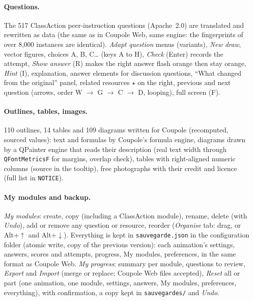 \paragraph{Questions.} The 517 ClassAction peer-instruction questions (Apache~2.0) are translated and rewritten as
data (the same as in Coupole Web, same engine: the fingerprints of over 8,000 instances are identical). \emph{Adapt
question} menus (variants), \emph{New draw}, vector figures, choices A, B, C\dots{} (keys A to H), \emph{Check} (Enter)
records the attempt, \emph{Show answer} (R) makes the right answer flash orange then stay orange, \emph{Hint} (I),
explanation, answer elements for discussion questions, “What changed from the original” panel, related resources $\star$ on
the right, previous and next question (arrows, order W $\to$ G $\to$ C $\to$ D, looping), full screen (F).

\paragraph{Outlines, tables, images.} 110 outlines, 14 tables and 109 diagrams written for Coupole (recomputed,
sourced values): text and formulas by Coupole's formula engine, diagrams drawn by a QPainter engine that reads their
description (real text width through \texttt{QFontMetricsF} for margins, overlap check), tables with right-aligned
numeric columns (source in the tooltip), free photographs with their credit and licence (full list in
\texttt{NOTICE}).

\paragraph{My modules and backup.} \emph{My modules}: create, copy (including a ClassAction module), rename, delete
(with \emph{Undo}), add or remove any question or resource, reorder (\emph{Organise} tab: drag, or Alt+$\uparrow$ and Alt+$\downarrow$).
Everything is kept in \texttt{sauvegarde.json} in the configuration folder (atomic write, copy of the previous version):
each animation's settings, answers, scores and attempts, progress, My modules, preferences, in the same format as
Coupole Web. \emph{My progress}: summary per module, questions to review, \emph{Export} and \emph{Import} (merge or
replace; Coupole Web files accepted), \emph{Reset} all or part (one animation, one module, settings, answers, My
modules, preferences, everything), with confirmation, a copy kept in \texttt{sauvegardes/} and \emph{Undo}.

